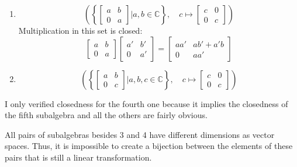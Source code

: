 \documentclass[12pt]{article}
\begin{document}
\begin{enumerate}
  \item \[
          \left(
          \left\{
          \begin{bmatrix}
            a & b \\
            0 & a
          \end{bmatrix}
          \mathrel{\Big|} a,b \in \mathbb{C}
          \right\},
          \quad
          c \mapsto
          \begin{bmatrix}
            c & 0 \\
            0 & c
          \end{bmatrix}
          \right)
        \]
        Multiplication in this set is closed:
        \[\begin{bmatrix}
            a & b \\
            0 & a
          \end{bmatrix}\begin{bmatrix}
            a' & b' \\
            0  & a'
          \end{bmatrix}
          = \begin{bmatrix}
            aa' & ab'+a'b \\
            0   & aa'
          \end{bmatrix}\]

  \item \[
          \left(
          \left\{
          \begin{bmatrix}
            a & b \\
            0 & c
          \end{bmatrix}
          \mathrel{\Big|} a,b,c \in \mathbb{C}
          \right\},
          \quad
          c \mapsto
          \begin{bmatrix}
            c & 0 \\
            0 & c
          \end{bmatrix}
          \right)
        \]
\end{enumerate}
I only verified closedness for the fourth one because it implies the closedness
of the fifth subalgebra and all the others are fairly obvious.

All pairs of subalgebras besides 3 and 4 have different dimensions as vector spaces.
Thus, it is impossible to create a bijection between the elements of these pairs
that is still a linear transformation.
\end{document}
